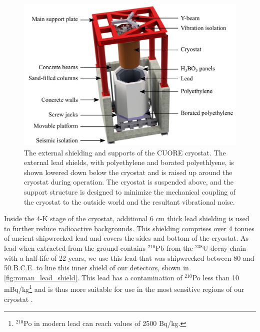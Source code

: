 \begin{figure}
    \centering
    \includegraphics[width=\linewidth]{Figures/Hut_ShieldingDown_02.pdf}
    \caption[The external shielding and supports of the CUORE cryostat.]
    {The external shielding and supports of the CUORE cryostat.
    The external lead shields, with polyethylene and borated polyethlyene, is shown lowered down below the cryostat and is raised up around the cryostat during operation.
    The cryostat is suspended above, and the support structure is designed to minimize the mechanical coupling of the cryostat to the outside world and the resultant vibrational noise.}
    \label{fig:external_shielding}
\end{figure}
Inside the 4-K stage of the cryostat, additional 6 cm thick lead shielding is used to further reduce radioactive backgrounds. This shielding comprises over 4 tonnes of ancient shipwrecked lead \cite{roman_lead} and covers the sides and bottom of the cryostat.
As lead when extracted from the ground contains $^{210}$Pb from the $^{238}$U decay chain with a half-life of 22 years, we use this lead that was shipwrecked between 80 and 50 B.C.E. to line this inner shield of our detectors, shown in \autoref{fig:roman_lead_shield}.
This lead has a contamination of $^{210}$Po less than 10 mBq/kg\footnote{$^{210}$Po in modern lead can reach values of 2500 Bq/kg.} and is thus more suitable for use in the most sensitive regions of our cryostat \cite{ALESSANDRELLO1998163}.  
